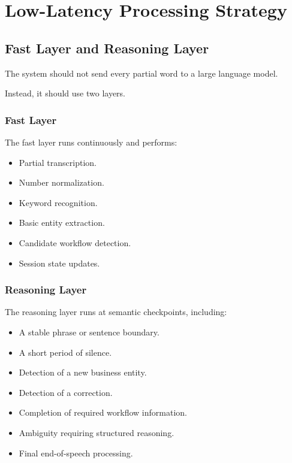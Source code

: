 \documentclass[11pt,a4paper]{article}
\begin{document}
\section{Low-Latency Processing Strategy}

\subsection{Fast Layer and Reasoning Layer}

The system should not send every partial word to a large language model.

Instead, it should use two layers.

\subsubsection{Fast Layer}

The fast layer runs continuously and performs:

\begin{itemize}
\item Partial transcription.
\item Number normalization.
\item Keyword recognition.
\item Basic entity extraction.
\item Candidate workflow detection.
\item Session state updates.
\end{itemize}

\subsubsection{Reasoning Layer}

The reasoning layer runs at semantic checkpoints, including:

\begin{itemize}
\item A stable phrase or sentence boundary.
\item A short period of silence.
\item Detection of a new business entity.
\item Detection of a correction.
\item Completion of required workflow information.
\item Ambiguity requiring structured reasoning.
\item Final end-of-speech processing.
\end{itemize}
\end{document}
